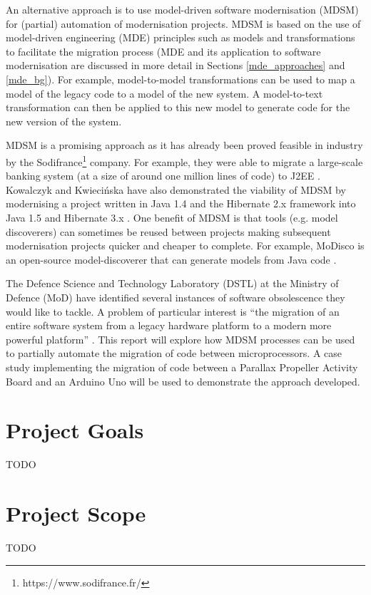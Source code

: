 \documentclass{UoYCSproject}
\begin{document}
An alternative approach is to use model-driven software modernisation (MDSM) for (partial) automation of modernisation projects. MDSM is based on the use of model-driven engineering (MDE) principles such as models and transformations to facilitate the migration process (MDE and its application to software modernisation are discussed in more detail in Sections \ref{mde_approaches} and \ref{mde_bg}). For example, model-to-model transformations can be used to map a model of the legacy code to a model of the new system. A model-to-text transformation can then be applied to this new model to generate code for the new version of the system.

MDSM is a promising approach as it has already been proved feasible in industry by the Sodifrance\footnote{https://www.sodifrance.fr/} company. For example, they were able to migrate a large-scale banking system (at a size of around one million lines of code) to J2EE \parencite{fleurey2007model}. Kowalczyk and Kwieci\'nska have also demonstrated the viability of MDSM by modernising a project written in Java 1.4 and the Hibernate 2.x framework into Java 1.5 and Hibernate 3.x \parencite{kowalczyk2009model}. One benefit of MDSM is that tools (e.g. model discoverers) can sometimes be reused between projects making subsequent modernisation projects quicker and cheaper to complete. For example, MoDisco is an open-source model-discoverer that can generate models from Java code \parencite{bruneliere2014modisco}.

The Defence Science and Technology Laboratory (DSTL) at the Ministry of Defence (MoD) have identified several instances of software obsolescence they would like to tackle. A problem of particular interest is ``the migration of an entire software system from a legacy hardware platform to a modern more powerful platform'' \parencite{gerasimou2017technical}. This report will explore how MDSM processes can be used to partially automate the migration of code between microprocessors. A case study implementing the migration of code between a Parallax Propeller Activity Board and an Arduino Uno will be used to demonstrate the approach developed.
 
\section{Project Goals}
TODO
\section{Project Scope}
TODO
\end{document}
